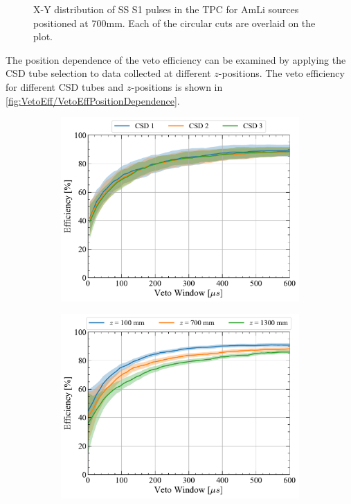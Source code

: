 \begin{enumerate}
\begin{figure}[!ht]
        \caption[X-Y distribution of SS S1 pulses in the TPC for AmLi sources positioned at 700mm.]{X-Y distribution of SS S1 pulses in the TPC for AmLi sources positioned at 700mm. Each of the circular cuts are overlaid on the plot.}
        \label{fig:VetoEff/CSDSelection}
    \end{figure}
    The position dependence of the veto efficiency can be examined by applying the CSD tube selection to data collected at different $z$-positions. The veto efficiency for different CSD tubes and $z$-positions is shown in \autoref{fig:VetoEff/VetoEffPositionDependence}.
    \begin{figure}[!ht]
    	\centering
    	\begin{subfigure}[b]{0.49\textwidth}
    		\centering
    		\includegraphics[width=\textwidth]{figures/VetoEfficiency/Eff_AmLi_Total_AllCSD.pdf}
    		\caption{}
            \label{fig:VetoEff/VetoEffPositionDependenceZPos}
    	\end{subfigure}
    	\hfill
    	\begin{subfigure}[b]{0.49\textwidth}
    		\centering
    		\includegraphics[width=\textwidth]{figures/VetoEfficiency/Eff_AmLi_Total_AllHeights.pdf}

\end{subfigure}
\end{figure}
\end{enumerate}

